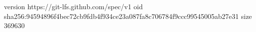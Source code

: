 version https://git-lfs.github.com/spec/v1
oid sha256:94594896f4bec72cb9fdb4f934ce23a087fa8c706784f9ccc99545005ab27e31
size 369630
